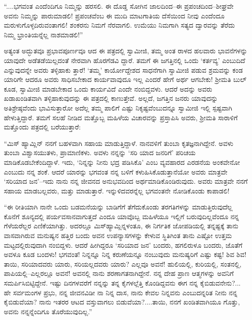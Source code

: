 “....ಭಗವಂತ ಎಂದೆಂದಿಗೂ ನಿಮ್ಮನ್ನು ಹರಸಲಿ. ಈ ದೊಡ್ಡ ಸೋಗಿನ ಜಾಲದಿಂದ–ಈ ಪ್ರಪಂಚದಿಂದ–ಶೀಘ್ರವೇ ಅವನು ನಿಮ್ಮನ್ನು ಪಾರುಮಾಡಲಿ! ಪ್ರಪಂಚವೆಂಬ ಈ ಮುದಿ ಮಾಟಗಾತಿಯ ದೆಸೆಯಿಂದ ನೀವು ಎಂದೆಂದೂ ಮರುಳುಗೊಳ್ಳದಿರುವಂತಾಗಲಿ! ಶಂಕರನು ನಿಮಗೆ ನೆರವಾಗಲಿ. ಉಮೆಯು ನಿಮಗಾಗಿ ಸತ್ಯದ ದ್ವಾರವನ್ನು ತೆರೆದು ನಿಮ್ಮ ಭ್ರಾಂತಿಯನ್ನೆಲ್ಲ ನಾಶಮಾಡಲಿ!”

ಅತ್ಯಂತ ಅದ್ಭುತವೂ ಪ್ರಭಾವಪೂರ್ಣವೂ ಆದ ಈ ಪತ್ರದಲ್ಲಿ ಸ್ವಾಮೀಜಿ, ತಮ್ಮ ಅಂತ ರಾಳದ ಹಲವಾರು ಭಾವನೆಗಳನ್ನು ಯಾವುದೇ ಅಡೆತಡೆಯಿಲ್ಲದಂತೆ ನೇರವಾಗಿ ಹೊರಗೆಡವಿ ದ್ದಾರೆ. ತಮಗೆ ಈ ಜಗತ್ತಿನಲ್ಲಿ ಒಂದು ‘ಕರ್ತವ್ಯ’ ಎಂಬುದಿದೆ ಎನ್ನುವುದನ್ನೇ ಅವರು ತಳ್ಳಿಹಾಕು ತ್ತಾರೆ! ‘ತಮ್ಮ’ ಕಾರ್ಯೋದ್ದೇಶದ ಸಾಧನೆಗಾಗಿ ಸ್ವಾಮೀಜಿ ಪಡುವ ಶ್ರಮವನ್ನು ಕಂಡ ಯಾರಿಗೇ ಆದರೂ ಅವರು ಸಾಧಿಸಬೇಕಾದ ಕಾರ್ಯವಾವುದೂ ಇಲ್ಲ ಎಂದರೆ ಹೇಗೆ ಅರ್ಥ ಆಗಬೇಕು! ಶ್ರೀಮತಿ ಬುಲ್ ಕೂಡ, ಸ್ವಾಮೀಜಿ ಮಾಡಬೇಕಾದ ಒಂದು ಕಾರ್ಯವಿದೆ ಎಂದೇ ನಂಬಿದ್ದವಳು. ಆದರೆ ಅದನ್ನು ಅವರು ಖಡಾಖಂಡಿತವಾಗಿ ತಳ್ಳಿಹಾಕುವುದನ್ನು ಈ ಪತ್ರದಲ್ಲಿ ಕಾಣುತ್ತೇವೆ. ಅಲ್ಲದೆ, ಜಗತ್ತಿನ ಜನರು ಯಾವುದನ್ನು ಅತಿಶ್ರೇಷ್ಠವೆಂದು ಭಾವಿಸುತ್ತಾರೋ ಅದೆಲ್ಲ ತಮ್ಮ ಪಾಲಿಗೆ ಎಷ್ಟು ನಿಕೃಷ್ಟವೆಂಬುದನ್ನೂ ಸ್ವಾಮೀಜಿ ಇಲ್ಲಿ ಸ್ಪಷ್ಟವಾಗಿ ಹೇಳುತ್ತಿದ್ದಾರೆ. ತಮಗೆ ಸಲಹೆ ನೀಡಿದ ಮತ್ತೊಬ್ಬ ಮಹಿಳೆಯ ವಿಚಾರವನ್ನು ಪ್ರಸ್ತಾಪಿಸಿ ಅವರು, ಶ್ರೀಮತಿ ಸಾರಾಳಿಗೆ ಮತ್ತೊಂದು ಪತ್ರದಲ್ಲಿ ಬರೆಯುತ್ತಾರೆ:

“ಮಿಸ್ ಹ್ಯಾಮ್ಲಿನ್ ನನಗೆ ಬಹಳವಾಗಿ ಸಹಾಯ ಮಾಡುತ್ತಿದ್ದಾಳೆ. ನಾನವಳಿಗೆ ತುಂಬಾ ಕೃತಜ್ಞನಾಗಿದ್ದೇನೆ. ಅವಳು ತುಂಬಾ ವಿಶ್ವಾಸಯುತಳು, ಪ್ರಾಮಾಣಿಕಳು. ಅವಳು ನನ್ನನ್ನು ‘ಸರಿ ಯಾದ ಜನರಿಗೆ’ ಪರಿಚಯ ಮಾಡಿಕೊಡಬೇಕೆಂದಿದ್ದಾಳೆ. ಇದು, ‘ನಿನ್ನನ್ನು ನೀನು ಭದ್ರ ಪಡಿಸಿಕೊ’ ಎಂಬ ವ್ಯವಹಾರದ ಎರಡನೆಯ ಅಂಕವೇನೋ ಎಂಬುದು ನನ್ನ ಶಂಕೆ. ಆದರೆ ಯಾರನ್ನು ಭಗವಂತ ನನ್ನ ಬಳಿಗೆ ಕಳುಹಿಸಿಕೊಡುತ್ತಾನೆಯೋ ಅವರು ಮಾತ್ರವೇ ‘ಸರಿಯಾದ ಜನ’–ಇದು ನಾನು ನನ್ನ ಜೀವನದ ಅನುಭವದಿಂದ ಅರ್ಥಮಾಡಿಕೊಂಡಿರುವುದು. ಅವರು ಮಾತ್ರವೇ ನನಗೆ ಸಹಾಯ ಮಾಡಬಲ್ಲವರು, ಮತ್ತು ಮಾಡುತ್ತಾರೆ. ಇನ್ನುಳಿದವರನ್ನೆಲ್ಲ ಭಗವಂತನೇ ನೋಡಿಕೊಂಡು ಕಾಪಾಡಲಿ!

“ಈ ರೀತಿಯಾಗಿ ನಾನೇ ಒಂದು ಬಡಮನೆಯನ್ನು ಬಾಡಿಗೆಗೆ ತೆಗೆದುಕೊಂಡು ತರಗತಿಗಳನ್ನು ಮಾಡುತ್ತಿರುವುದೆಲ್ಲ ಕೊನೆಗೆ ಶೂನ್ಯದಲ್ಲಿ ಪರ್ಯವಸಾನವಾಗುತ್ತದೆ ಎಂದೂ ಯಾವೊಬ್ಬ ಮಹಿಳೆಯೂ ಇಲ್ಲಿಗೆ ಬರುವುದಿಲ್ಲವೆಂದೂ ನನ್ನ ಗೆಳೆಯರೆಲ್ಲರ ಎಣಿಕೆಯಾಗಿತ್ತು. ಅದರಲ್ಲೂ ಮಿಸ್​ಹ್ಯಾಮ್ಲಿನ್ನಳಂತೂ, ಈ ನಿರ್ಗತಿಕ ಜೋಪಡಿಯಲ್ಲಿ ತನ್ನಷ್ಟಕ್ಕೆ ತಾನು ವಾಸವಾಗಿರುವ ಮನುಷ್ಯನ ಹತ್ತಿರ ಬಂದು ಅವನ ಉಪನ್ಯಾಸಗಳನ್ನು ಕೇಳುವ ಸ್ಥಿತಿಗಿಂತ ತಾನು ಎಷ್ಟೋ ಉತ್ತಮ ಮಟ್ಟದಲ್ಲಿರುವುದಾಗಿ ನಂಬಿದ್ದಳು. ಆದರೆ ಹೀಗಿದ್ದರೂ ‘ಸರಿಯಾದ ಜನ’ ಬಂದರು, ಹಗಲಿರುಳೂ ಬಂದರು, ಜೊತೆಗೆ ಅವಳೂ ಕೂಡ ಬಂದಳು! ಭಗವಂತ! ನಿನ್ನನ್ನೂ ನಿನ್ನ ಕರುಣೆಯನ್ನೂ ನಂಬುವುದು ಮನುಷ್ಯರಿಗೆ ಎಷ್ಟು ಕಷ್ಟ! ಶಿವ ಶಿವ! ತಾಯಿ, ಸರಿಯಾದವರು ಯಾರು, ಸರಿಯಲ್ಲದವರು ಯಾರು? ಎಲ್ಲವೂ ಅವನೆ! ಹುಲಿಯಲ್ಲಿ, ಕುರಿಯಲ್ಲಿ, ಸಂತನಲ್ಲಿ, ಪಾಪಿಯಲ್ಲಿ–ಎಲ್ಲರಲ್ಲೂ ಅವನೆ! ಅವನಲ್ಲಿ ನಾನು ಶರಣಾಗತನಾಗಿದ್ದೇನೆ. ನನ್ನ ದೇಹ ಪ್ರಾಣ ಆತ್ಮಗಳನ್ನು ಅವನಿಗೆ ಸಮರ್ಪಿಸಿಬಿಟ್ಟಿದ್ದೇನೆ. ಇಷ್ಟು ದಿನಗಳವರೆಗೆ ನನ್ನನ್ನು ತನ್ನ ಕೈಗಳಲ್ಲೆತ್ತಿ ಕೊಂಡಿದ್ದವನು ಈಗ ನನ್ನ ಕೈಬಿಡುವನೇನು?... ಹೇ ಸರ್ವಮಂಗಳ ಪ್ರಭು, ನನ್ನ ಜೀವನವಿಡೀ ನಾ ನಿನ್ನ ದಾಸ, ನಾನು ಕೇವಲ ನಿನ್ನವನು ಎಂಬುದನ್ನರಿತ ನೀನು ನನ್ನ ಕೈಬಿಡುವೆಯಾ? ನಾನು ಇತರರ ಆಟದ ವಸ್ತುವಾಗಲು ಬಿಡುವೆಯಾ?....ತಾಯಿ, ನನಗೆ ಖಂಡಿತವಾಗಿಯೂ ಗೊತ್ತು, ಅವನು ನನ್ನನ್ನೆಂದಿಗೂ ತೊರೆಯುವುದಿಲ್ಲ.”

